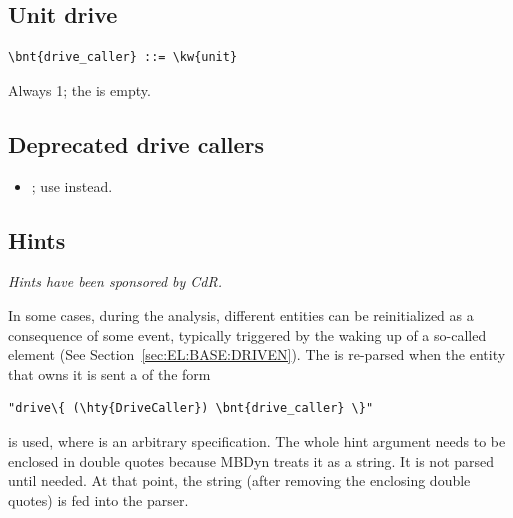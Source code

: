 \subsection{Unit drive}
\begin{Verbatim}[commandchars=\\\{\}]
    \bnt{drive_caller} ::= \kw{unit}
\end{Verbatim}
Always 1; the  is empty.

\subsection{Deprecated drive callers}
\begin{itemize}
\item {}; use  instead.
\end{itemize}








\subsection{Hints}\label{sec:GENERAL:DRIVE:HINT}
\emph{Hints have been sponsored
by  CdR.}
\bigskip

In some cases, during the analysis, different entities can be reinitialized
as a consequence of some event, typically triggered by the waking up 
of a so-called  element (See Section~\ref{sec:EL:BASE:DRIVEN}).
The  is re-parsed when the entity that owns it is sent
a  of the form
\begin{Verbatim}[commandchars=\\\{\}]
    "drive\{ (\hty{DriveCaller}) \bnt{drive_caller} \}"
\end{Verbatim}
is used, where  is an arbitrary 
specification.
The whole hint argument needs to be enclosed in double quotes because MBDyn
treats it as a string.
It is not parsed until needed.
At that point, the string (after removing the enclosing double quotes)
is fed into the parser.

